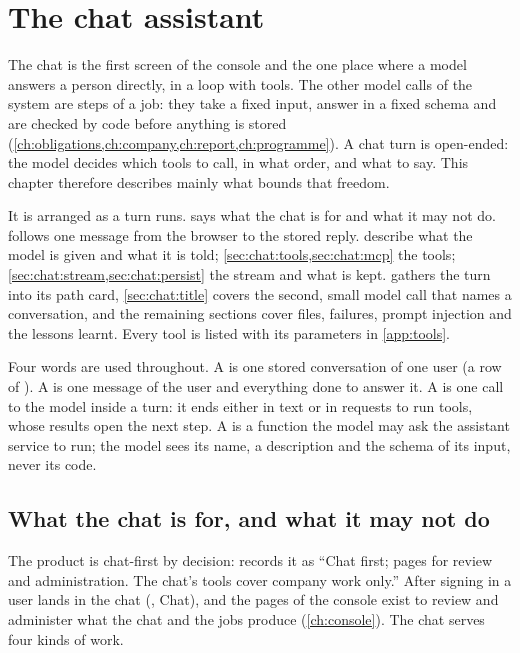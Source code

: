 \chapter{The chat assistant}\label{ch:chat}

The chat is the first screen of the console and the one place where a model answers a person
directly, in a loop with tools. The other model calls of the system are steps of a job: they
take a fixed input, answer in a fixed schema and are checked by code before anything is stored
(\cref{ch:obligations,ch:company,ch:report,ch:programme}). A chat turn is open-ended: the
model decides which tools to call, in what order, and what to say. This chapter therefore
describes mainly what bounds that freedom.

It is arranged as a turn runs.  says what the chat is for and what it
may not do.  follows one message from the browser to the stored reply.
 describe what the model is given and what it is told;
\cref{sec:chat:tools,sec:chat:mcp} the tools; \cref{sec:chat:stream,sec:chat:persist} the
stream and what is kept.  gathers the turn into its path card,
\cref{sec:chat:title} covers the second, small model call that names a conversation, and the
remaining sections cover files, failures, prompt injection and the lessons learnt. Every tool
is listed with its parameters in \cref{app:tools}.

Four words are used throughout. A  is one stored conversation of one user (a row
of ). A  is one message of the user and everything done to
answer it. A  is one call to the model inside a turn: it ends either in text or in
requests to run tools, whose results open the next step. A  is a function the model
may ask the assistant service to run; the model sees its name, a description and the schema of
its input, never its code.


\section{What the chat is for, and what it may not do}\label{sec:chat:purpose}

The product is chat-first by decision:  records it as \enquote{Chat
first; pages for review and administration. The chat's tools cover company work only.} After
signing in a user lands in the chat (, Chat), and the pages of the console exist
to review and administer what the chat and the jobs produce (\cref{ch:console}). The chat
serves four kinds of work.

